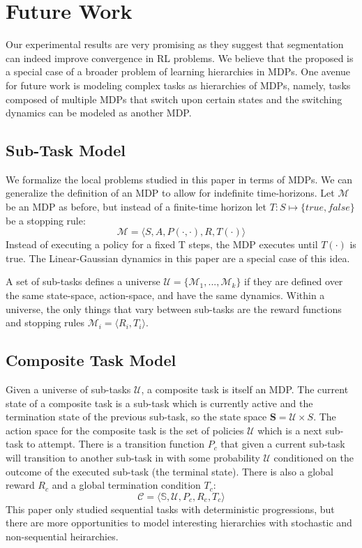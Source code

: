 \section{Future Work}
Our experimental results are very promising as they suggest that segmentation can indeed improve convergence in RL problems.
We believe that the proposed \hirl is a special case of a broader problem of learning hierarchies in MDPs.
One avenue for future work is modeling complex tasks as hierarchies of MDPs, namely, tasks composed of multiple MDPs that switch upon certain states and the switching dynamics can be modeled as another MDP. 

\subsection{Sub-Task Model}
We formalize the local problems studied in this paper in terms of MDPs.
We can generalize the definition of an MDP to allow for indefinite time-horizons.
Let $\mathcal{M}$ be an MDP as before, but instead of a finite-time horizon let $T:S\mapsto\{true,false\}$ be a stopping rule: 
\[\mathcal{M}=\langle S,A,P(\cdot,\cdot),R,T(\cdot)\rangle\]
Instead of executing a policy for a fixed T steps, the MDP executes until $T(\cdot)$ is true. 
The Linear-Gaussian dynamics in this paper are a special case of this idea.

A set of sub-tasks defines a universe $\mathcal{U} = \{\mathcal{M}_1,...,\mathcal{M}_k\}$ if they  are defined over the same state-space, action-space, and have the same dynamics. Within a universe, the only things that vary between sub-tasks are the reward functions and stopping rules
$\mathcal{M}_{i}=\langle R_{i},T_{i}\rangle$.

\subsection{Composite Task Model}
Given a universe of sub-tasks $\mathcal{U}$, a composite task is itself an MDP.
The current state of a composite task is a sub-task which is currently active and the termination state of the previous sub-task, so the state space $\mathbf{S} = \mathcal{U} \times S$.
The action space for the composite task is the set of policies $\mathcal{U}$ which is a next sub-task to attempt.
There is a transition function $P_{c}$ that given a current sub-task will transition to another sub-task in with some probability $\mathcal{U}$ conditioned on the outcome of the executed sub-task (the terminal state).
There is also a global reward $R_{c}$ and a global termination condition $T_{c}$:
\[
\mathcal{C} = \langle \mathbb{S}, \mathcal{U}, P_{c}, R_{c}, T_{c} \rangle
\]
This paper only studied sequential tasks with deterministic progressions, but  there are more opportunities to model interesting hierarchies with stochastic and non-sequential heirarchies.

